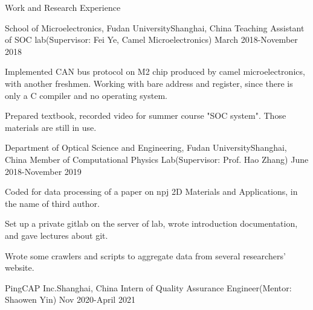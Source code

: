 \documentclass{resume} %
\begin{document}
\begin{rSection}{Work and Research Experience}

\begin{rSubsection}
{School of Microelectronics, Fudan University}{Shanghai, China}
{Teaching Assistant of SOC lab(Supervisor: Fei Ye, Camel Microelectronics)}
{March 2018-November 2018}

\item Implemented CAN bus protocol on M2 chip produced by camel microelectronics, with another freshmen. Working with bare address and register, since there is only a C compiler and no operating system.
\item Prepared textbook, recorded video for summer course "SOC system". Those materials are still in use.
 
\end{rSubsection}



\begin{rSubsection}
{Department of Optical Science and Engineering, Fudan University}{Shanghai, China}
{Member of Computational Physics Lab(Supervisor: Prof. Hao Zhang)}
{June 2018-November 2019}

\item Coded for data processing of a paper on npj 2D Materials and Applications, in the name of third author.
\item Set up a private gitlab on the server of lab, wrote introduction documentation, and gave lectures about git.
\item Wrote some crawlers and scripts to aggregate data from several researchers' website.


\end{rSubsection}


\begin{rSubsection}
{PingCAP Inc.}{Shanghai, China}
{Intern of Quality Assurance Engineer(Mentor: Shaowen Yin)} {Nov 2020-April 2021}


\end{rSubsection}
\end{rSection}
\end{document}
